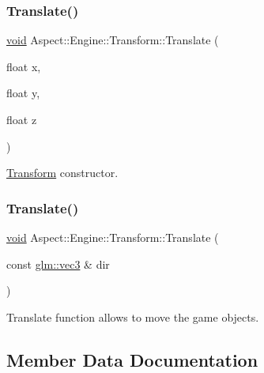 \subsubsection{\texorpdfstring{Translate()}{Translate()}\hspace{0.1cm}{\footnotesize\ttfamily [1/2]}}
{\footnotesize\ttfamily \mbox{\hyperlink{_s_d_l__opengles2__gl2ext_8h_ae5d8fa23ad07c48bb609509eae494c95}{void}} Aspect\+::\+Engine\+::\+Transform\+::\+Translate (\begin{DoxyParamCaption}\item[{float}]{x,  }\item[{float}]{y,  }\item[{float}]{z }\end{DoxyParamCaption})}



\mbox{\hyperlink{class_aspect_1_1_engine_1_1_transform}{Transform}} constructor. 

\mbox{\label{class_aspect_1_1_engine_1_1_transform_aa8fb62f3dd866556d14f8074657270d5}} 
\subsubsection{\texorpdfstring{Translate()}{Translate()}\hspace{0.1cm}{\footnotesize\ttfamily [2/2]}}
{\footnotesize\ttfamily \mbox{\hyperlink{_s_d_l__opengles2__gl2ext_8h_ae5d8fa23ad07c48bb609509eae494c95}{void}} Aspect\+::\+Engine\+::\+Transform\+::\+Translate (\begin{DoxyParamCaption}\item[{const \mbox{\hyperlink{group__core__types_ga1c47e8b3386109bc992b6c48e91b0be7}{glm\+::vec3}} \&}]{dir }\end{DoxyParamCaption})}



Translate function allows to move the game objects. 



\subsection{Member Data Documentation}
\mbox{\label{class_aspect_1_1_engine_1_1_transform_a87dec7395e05a8ecd54c984e150dd57a}} 
